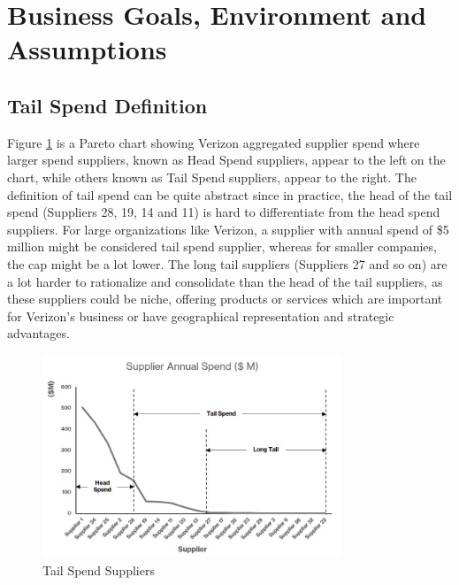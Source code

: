 \documentclass[inte,nonblindrev]{informs3} %
\begin{document}
\section{Business Goals, Environment and Assumptions}
\subsection{Tail Spend Definition}
Figure \ref{fig:fig1} is a Pareto chart showing Verizon aggregated supplier spend where larger spend suppliers, known as Head Spend suppliers, appear to the left on the chart, while others known as Tail Spend suppliers, appear to the right. The definition of tail spend can be quite abstract since in practice, the head of the tail spend (Suppliers 28, 19, 14 and 11) is hard to differentiate from the head spend suppliers. For large organizations like Verizon, a supplier with annual spend of \$5 million might be considered tail spend supplier, whereas for smaller companies, the cap might be a lot lower. The long tail suppliers (Suppliers 27 and so on) are a lot harder to rationalize and consolidate than the head of the tail suppliers, as these suppliers could be niche, offering products or services which are important for Verizon's business or have geographical representation and strategic advantages. 

\begin{figure}
\includegraphics[width = 0.8\textwidth]{TailSpendBW.jpg}
\caption{Tail Spend Suppliers}
\label{fig:fig1}
\end{figure}
\end{document}
